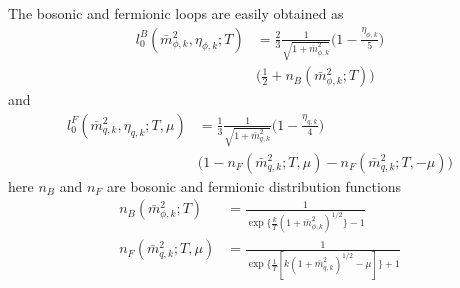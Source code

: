 \documentclass[%
reprint,
superscriptaddress,
showpacs,preprintnumbers,
 amsmath,amssymb,
 aps,
prd,
]{revtex4-1}
\begin{document}
The bosonic and fermionic loops are easily obtained as
\begin{align}
	l_0^B(\bar m_{\phi,k}^2,\eta_{\phi,k};T)&=\frac{2}{3}\frac{1}{\sqrt{1+\bar m_{\phi,k}^2}} \Big ( 1-\frac{\eta_{\phi,k}}{5}\Big) \nonumber\\[2ex]
	&\Big( \frac{1}{2}+n_B(\bar m_{\phi,k}^2;T) \Big)\label{eq:lB0}
\end{align}
and
\begin{align}
	l_0^F(\bar m_{q,k}^2,\eta_{q,k};T,\mu)&=\frac{1}{3} \frac{1}{\sqrt{1+\bar m_{q,k}^2}} \Big(1-\frac{\eta_{q,k}}{4}\Big) \nonumber\\[2ex]
	&\Big(1-n_F(\bar{m}_{q,k}^2;T,\mu)-n_F(\bar{m}_{q,k}^2;T,-\mu)\Big)\label{eq:lF0}
\end{align}
here $n_B$ and  $n_F$ are  bosonic and fermionic distribution functions
\begin{align}
	n_B(\bar m_{\phi,k}^2;T)&=\frac{1}{\exp\Big\{\frac{k}{T}(1+\bar m_{\phi,k}^2)^{1/2}\Big\}-1}\nonumber\\[2ex]
	n_F(\bar{m}_{q,k}^2;T,\mu)&=\frac{1}{\exp\Big\{\frac{1}{T}[k(1+\bar{m}_{q,k}^2)^{1/2}-\mu]\Big\}+1}
\end{align}
\end{document}
